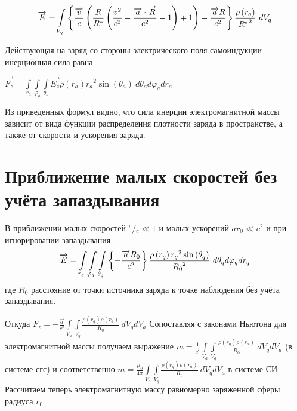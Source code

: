 \documentclass{article}
\begin{document}
\[\overrightarrow{E}=\int\limits_{{{V}_{q}}}\\
{\left\{ \frac{\overrightarrow{v}}{c}\left( \frac{R}{{{R}^{*}}}\left( \frac{{{v}^{2}}}{{{c}^{2}}}-\frac{\overrightarrow{a}\cdot \overrightarrow{R}}{{{c}^{2}}}-1 \right)+1 \right)-\frac{\overrightarrow{a}R}{{{c}^{2}}} \right\}\frac{\rho \left( {{r}_{q}} \right)}{{{R}^{*}}^{2}}\ }d{{V }_{q}}\]


Действующая на заряд со стороны электрического поля самоиндукции инерционная сила равна

$\overrightarrow{{{F}_{z}}}=\int\limits_{{{r}_{a}}}\int\limits_{{{\varphi}_{a}}}\int\limits_{{{\theta}_{a}}}{\overrightarrow{{{E}_{z}}}\rho \left( {{r}_{a}} \right){{r}_{a}}^{2}\sin \left( {{\theta }_{a}} \right)}\ d{{\theta }_{a}}d{{\varphi }_{a}}d{{r}_{a}}$


Из приведенных формул видно, что сила инерции электромагнитной массы зависит от вида функции распределения плотности заряда в пространстве, а также от скорости и ускорения заряда.

\section{Приближение малых скоростей без учёта запаздывания}

В приближении малых скоростей ${}^{v}/{}_{c}\ll 1$  и малых ускорений $a{{r}_{0}}\ll {{c}^{2}}$ и при игнорировании запаздывания
\[\overrightarrow{E}=\int\limits_{{{r}_{q}}}\int\limits_{{{\varphi}_{q}}}\int\limits_{{{\theta}_{q}}}\\
{\left\{ -\frac{\overrightarrow{a}R_{0}}{{{c}^{2}}} \right\}\frac{\rho \left( {{r}_{q}} \right){{r}_{q}}^{2}\sin \left( {{\theta }_{q}} \right)}{{{R}_{0}}^{2}}\ }d{{\theta }_{q}}d{{\varphi }_{q}}d{{r}_{q}}\]
где ${R}_{0}$ расстояние от точки источника заряда к точке наблюдения без учёта запаздывания.

Откуда
${{F}_{z}}=-\frac{\overrightarrow{a}}{{{c}^{^{2}}}}\int\limits_{{{V}_{a}}}{\int\limits_{{{V}_{q}}}{\frac{\rho \left( {{r}_{q}} \right)\rho \left( {{r}_{a}} \right)}{R_{0}}}}\ d{{V}_{q}}d{{V}_{a}}$
Сопоставляя с законами Ньютона для электромагнитной массы получаем выражение
$m=\frac{1}{{{c}^{^{2}}}}\int\limits_{{{V}_{a}}}{\int\limits_{{{V}_{q}}}{\frac{\rho \left( {{r}_{q}} \right)\rho \left( {{r}_{a}} \right)}{R_{0}}}}\ d{{V}_{q}}d{{V}_{a}}$ (в системе сгс) и соответственно $m=\frac{{{\mu }_{0}}}{4\pi }\int\limits_{{{V}_{a}}}{\int\limits_{{{V}_{q}}}{\frac{\rho \left( {{r}_{q}} \right)\rho \left( {{r}_{a}} \right)}{R_{0}}}}\ d{{V}_{q}}d{{V}_{a}}$ в системе СИ
Рассчитаем теперь электромагнитную массу равномерно заряженной сферы радиуса ${{r}_{0}}$
\end{document}
